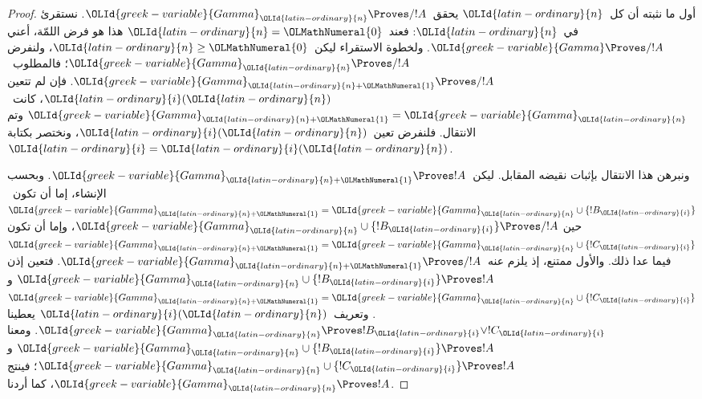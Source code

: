 \documentclass[../../../include/open-logic-section]{subfiles}
\begin{document}
\begin{proof}
  أول ما نثبته أن كل~$\OLId{latin-ordinary}{n}$ يحقق~$\OLId{greek-variable}{Gamma}_\OLId{latin-ordinary}{n} \Proves/ !A$. نستقرئ
  في~$\OLId{latin-ordinary}{n}$: فعند~$\OLId{latin-ordinary}{n}=\OLMathNumeral{0}$ هذا هو فرض اللمّة، أعني
  $\OLId{greek-variable}{Gamma} \Proves/ !A$. ولخطوة الاستقراء ليكن~$\OLId{latin-ordinary}{n}\geq \OLMathNumeral{0}$، ولنفرض
  $\OLId{greek-variable}{Gamma}_\OLId{latin-ordinary}{n} \Proves/ !A$؛ فالمطلوب~$\OLId{greek-variable}{Gamma}_{\OLId{latin-ordinary}{n}+\OLMathNumeral{1}} \Proves/ !A$. فإن لم تتعين
  $\OLId{latin-ordinary}{i}(\OLId{latin-ordinary}{n})$، كانت~$\OLId{greek-variable}{Gamma}_{\OLId{latin-ordinary}{n}+\OLMathNumeral{1}}=\OLId{greek-variable}{Gamma}_\OLId{latin-ordinary}{n}$ وتم الانتقال. فلنفرض
  تعين~$\OLId{latin-ordinary}{i}(\OLId{latin-ordinary}{n})$، ونختصر بكتابة~$\OLId{latin-ordinary}{i}=\OLId{latin-ordinary}{i}(\OLId{latin-ordinary}{n})$.

  ونبرهن هذا الانتقال بإثبات نقيضه المقابل. ليكن~$\OLId{greek-variable}{Gamma}_{\OLId{latin-ordinary}{n}+\OLMathNumeral{1}} \Proves !A$.
  وبحسب الإنشاء، إما أن تكون~$\OLId{greek-variable}{Gamma}_{\OLId{latin-ordinary}{n}+\OLMathNumeral{1}}=\OLId{greek-variable}{Gamma}_\OLId{latin-ordinary}{n}\cup\{!B_\OLId{latin-ordinary}{i}\}$ حين
  $\OLId{greek-variable}{Gamma}_\OLId{latin-ordinary}{n}\cup\{!B_\OLId{latin-ordinary}{i}\}\Proves/!A$، وإما أن تكون
  $\OLId{greek-variable}{Gamma}_{\OLId{latin-ordinary}{n}+\OLMathNumeral{1}}=\OLId{greek-variable}{Gamma}_\OLId{latin-ordinary}{n}\cup\{!C_\OLId{latin-ordinary}{i}\}$ فيما عدا ذلك. والأول ممتنع، إذ
  يلزم عنه~$\OLId{greek-variable}{Gamma}_{\OLId{latin-ordinary}{n}+\OLMathNumeral{1}}\Proves/!A$. فتعين إذن
  $\OLId{greek-variable}{Gamma}_\OLId{latin-ordinary}{n}\cup\{!B_\OLId{latin-ordinary}{i}\}\Proves !A$ و
  $\OLId{greek-variable}{Gamma}_{\OLId{latin-ordinary}{n}+\OLMathNumeral{1}}=\OLId{greek-variable}{Gamma}_\OLId{latin-ordinary}{n}\cup\{!C_\OLId{latin-ordinary}{i}\}$. وتعريف~$\OLId{latin-ordinary}{i}(\OLId{latin-ordinary}{n})$ يعطينا
  $\OLId{greek-variable}{Gamma}_\OLId{latin-ordinary}{n}\Proves !B_\OLId{latin-ordinary}{i}\lor !C_\OLId{latin-ordinary}{i}$. ومعنا
  $\OLId{greek-variable}{Gamma}_\OLId{latin-ordinary}{n}\cup\{!B_\OLId{latin-ordinary}{i}\}\Proves !A$ و
  $\OLId{greek-variable}{Gamma}_\OLId{latin-ordinary}{n}\cup\{!C_\OLId{latin-ordinary}{i}\}\Proves !A$؛ فينتج
  $\OLId{greek-variable}{Gamma}_\OLId{latin-ordinary}{n}\Proves !A$، كما أردنا.


\end{proof}
\end{document}
